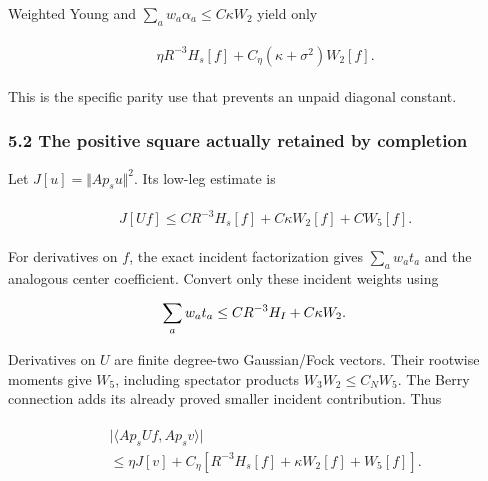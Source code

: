 Weighted Young and \(\sum _{a} w_{a} \alpha _{a}\le C \kappa  W_{2}\)
yield only

\begin{gather*}
\begin{aligned}
& \eta  R^{-3}H_{s}[f]+C_{\eta}(\kappa +\sigma ^{2})W_{2}[f].
\end{aligned}\tag{5.4}
\end{gather*}

This is the specific parity use that prevents an unpaid diagonal
constant.

\subsubsection{5.2 The positive square actually retained by
completion}\label{i-the-positive-square-actually-retained-by-completion}

Let \(J[u]=\Vert A p_{s} u\Vert ^{2}\). Its low-leg estimate is

\begin{gather*}
\begin{aligned}
& J[Uf]\le C R^{-3}H_{s}[f]+C \kappa  W_{2}[f]+C W_{5}[f].
\end{aligned}\tag{5.5}
\end{gather*}

For derivatives on \(f\), the exact incident factorization gives
\(\sum _{a} w_{a} t_{a}\) and the analogous center coefficient. Convert
only these incident weights using

\begin{gather*}
\begin{aligned}
& \sum _{a} w_{a} t_{a}\le C R^{-3}H_{I}+C \kappa  W_{2}.
\end{aligned}\notag
\end{gather*}

Derivatives on \(U\) are finite degree-two Gaussian/Fock vectors. Their
rootwise moments give \(W_{5}\), including spectator products
\(W_{3}W_{2}\le C_{N}W_{5}\). The Berry connection adds its already
proved smaller incident contribution. Thus

\begin{gather*}
\begin{aligned}
& \vert \langle A p_{s} U f,A p_{s} v\rangle \vert \\
& \le \eta  J[v]+C_{\eta}[R^{-3}H_{s}[f]+\kappa  W_{2}[f]+W_{5}[f]].
\end{aligned}\tag{5.6}
\end{gather*}

